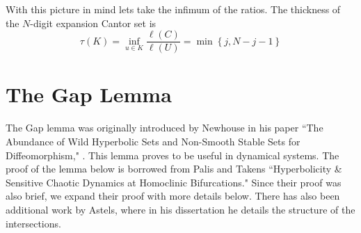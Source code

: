 \begin{example}
    With this picture in mind lets take the infimum of the ratios.  The thickness of the $N$\hyphen{digit} expansion Cantor set is 
    $$\tau(K) = \inf_{u\in K}\frac{\ell(C)}{\ell(U)} = \min\left\{j,N-j-1\right\}$$
\end{example}  
\section{The Gap Lemma}

The Gap lemma was originally introduced by Newhouse in his paper ``The Abundance of Wild Hyperbolic Sets and Non-Smooth Stable Sets for Diffeomorphism," \cite{Newhouse}.  This lemma proves to be useful in dynamical systems. The proof of the lemma below is borrowed from Palis and Takens ``Hyperbolicity \& Sensitive Chaotic Dynamics at Homoclinic Bifurcations." Since their proof was also brief, we expand their proof with more details below.  There has also been additional work by Astels, where in his dissertation \cite{Astels} he details the structure of the intersections. 




